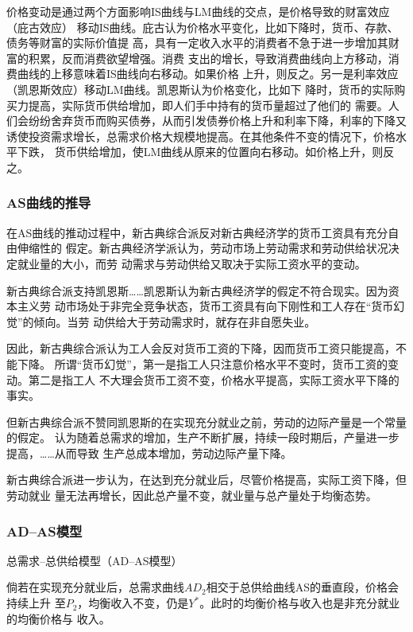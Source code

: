 价格变动是通过两个方面影响IS曲线与LM曲线的交点，是价格导致的财富效应（庇古效应）
移动IS曲线。庇古认为价格水平变化，比如下降时，货币、存款、债务等财富的实际价值提
高，具有一定收入水平的消费者不急于进一步增加其财富的积累，反而消费欲望增强。消费
支出的增长，导致消费曲线向上方移动，消费曲线的上移意味着IS曲线向右移动。如果价格
上升，则反之。另一是利率效应（凯恩斯效应）移动LM曲线。凯恩斯认为价格变化，比如下
降时，货币的实际购买力提高，实际货币供给增加，即人们手中持有的货币量超过了他们的
需要。人们会纷纷舍弃货币而购买债券，从而引发债券价格上升和利率下降，利率的下降又
诱使投资需求增长，总需求价格大规模地提高。在其他条件不变的情况下，价格水平下跌，
货币供给增加，使LM曲线从原来的位置向右移动。如价格上升，则反之。

\subsubsection{AS曲线的推导}

在AS曲线的推动过程中，新古典综合派反对新古典经济学的货币工资具有充分自由伸缩性的
假定。新古典经济学派认为，劳动市场上劳动需求和劳动供给状况决定就业量的大小，而劳
动需求与劳动供给又取决于实际工资水平的变动。

新古典综合派支持凯恩斯……凯恩斯认为新古典经济学的假定不符合现实。因为资本主义劳
动市场处于非完全竞争状态，货币工资具有向下刚性和工人存在“货币幻觉”的倾向。当劳
动供给大于劳动需求时，就存在非自愿失业。

因此，新古典综合派认为工人会反对货币工资的下降，因而货币工资只能提高，不能下降。
所谓“货币幻觉”，第一是指工人只注意价格水平不变时，货币工资的变动。第二是指工人
不大理会货币工资不变，价格水平提高，实际工资水平下降的事实。

但新古典综合派不赞同凯恩斯的在实现充分就业之前，劳动的边际产量是一个常量的假定。
认为随着总需求的增加，生产不断扩展，持续一段时期后，产量进一步提高，……从而导致
生产总成本增加，劳动边际产量下降。

新古典综合派进一步认为，在达到充分就业后，尽管价格提高，实际工资下降，但劳动就业
量无法再增长，因此总产量不变，就业量与总产量处于均衡态势。

\subsubsection{AD--AS模型}

总需求--总供给模型（AD--AS模型）

倘若在实现充分就业后，总需求曲线$AD_2$相交于总供给曲线AS的垂直段，价格会持续上升
至$P_2$，均衡收入不变，仍是$Y^*$。此时的均衡价格与收入也是非充分就业的均衡价格与
收入。

